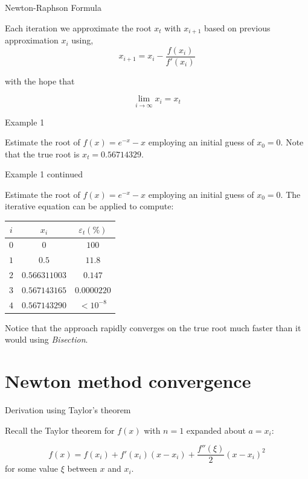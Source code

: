 \documentclass[12pt]{beamer}
\begin{document}
\begin{frame}{Newton-Raphson Formula}

Each iteration we approximate the root $x_t$ with $x_{i+1}$ based on previous approximation $x_i$ using,
\begin{equation}
x_{i+1}=x_i - \frac{f(x_i)}{f'(x_i)}
\end{equation}

\noindent
with the hope that 

\begin{equation}
\lim_{i \rightarrow \infty} x_i = x_t 
\end{equation} 
\end{frame}

\begin{frame}{Example 1} 

Estimate the root of $f(x) = e^{-x} -x$ employing an initial guess of
$x_0 = 0$. Note that the true root is $x_t=0.56714329$.
\vspace{3 in}
\end{frame}

\begin{frame}{Example 1 continued} 

Estimate the root of $f(x) = e^{-x} -x$ employing an initial guess of
$x_0 = 0$. The iterative equation can be applied to compute: 

\begin{table}[h]
\begin{tabular}{c|c|c} 
$i$ & $x_i$ & $\varepsilon_t(\%)$ \\ 
\hline 
$0$ & $0$ & $100$ \\
$1$ & $0.5$ & $11.8$ \\ 
$2$ & $0.566311003$ & $0.147$ \\
$3$ & $0.567143165$ & $0.0000220$ \\ 
$4$ & $0.567143290$ & $<10^{-8}$ \\  
\hline
\end{tabular} 
\end{table} 
\noindent 
Notice that the approach rapidly converges on the true root much faster than 
it would using {\it Bisection}. 
\end{frame} 

\section{Newton method convergence}

\begin{frame}{Derivation using Taylor's theorem}

Recall the Taylor theorem for $f(x)$ with $n=1$ expanded about $a=x_i$:

\begin{equation} 
f(x) = f(x_i) + f'(x_i)(x-x_i) + \frac{f''(\xi)}{2}(x-x_i)^2
\end{equation}
\noindent 
for some value $\xi$ between $x$ and $x_i$.
\end{frame} 
\end{document}

